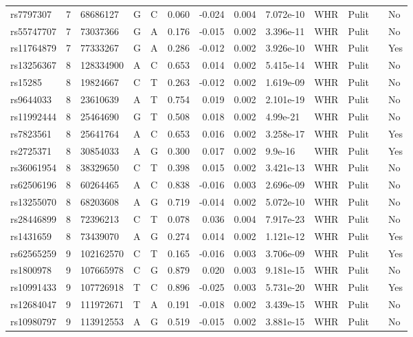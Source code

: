 \documentclass[11pt,twoside]{bristolthesis}
\begin{document}
\begin{longtable}[t]{lrlllrrrlllll}
rs7797307 & 7 & 68686127 & G & C & 0.060 & -0.024 & 0.004 & 7.072e-10 & WHR & Pulit &  & No\\
rs55747707 & 7 & 73037366 & G & A & 0.176 & -0.015 & 0.002 & 3.396e-11 & WHR & Pulit &  & No\\
rs11764879 & 7 & 77333267 & G & A & 0.286 & -0.012 & 0.002 & 3.926e-10 & WHR & Pulit &  & Yes\\
\addlinespace
rs13256367 & 8 & 128334900 & A & C & 0.653 & 0.014 & 0.002 & 5.415e-14 & WHR & Pulit &  & No\\
rs15285 & 8 & 19824667 & C & T & 0.263 & -0.012 & 0.002 & 1.619e-09 & WHR & Pulit &  & No\\
rs9644033 & 8 & 23610639 & A & T & 0.754 & 0.019 & 0.002 & 2.101e-19 & WHR & Pulit &  & No\\
rs11992444 & 8 & 25464690 & G & T & 0.508 & 0.018 & 0.002 & 4.99e-21 & WHR & Pulit &  & No\\
rs7823561 & 8 & 25641764 & A & C & 0.653 & 0.016 & 0.002 & 3.258e-17 & WHR & Pulit &  & Yes\\
\addlinespace
rs2725371 & 8 & 30854033 & A & G & 0.300 & 0.017 & 0.002 & 9.9e-16 & WHR & Pulit &  & Yes\\
rs36061954 & 8 & 38329650 & C & T & 0.398 & 0.015 & 0.002 & 3.421e-13 & WHR & Pulit &  & No\\
rs62506196 & 8 & 60264465 & A & C & 0.838 & -0.016 & 0.003 & 2.696e-09 & WHR & Pulit &  & No\\
rs13255070 & 8 & 68203608 & A & G & 0.719 & -0.014 & 0.002 & 5.072e-10 & WHR & Pulit &  & No\\
rs28446899 & 8 & 72396213 & C & T & 0.078 & 0.036 & 0.004 & 7.917e-23 & WHR & Pulit &  & No\\
\addlinespace
rs1431659 & 8 & 73439070 & A & G & 0.274 & 0.014 & 0.002 & 1.121e-12 & WHR & Pulit &  & Yes\\
rs62565259 & 9 & 102162570 & C & T & 0.165 & -0.016 & 0.003 & 3.706e-09 & WHR & Pulit &  & Yes\\
rs1800978 & 9 & 107665978 & C & G & 0.879 & 0.020 & 0.003 & 9.181e-15 & WHR & Pulit &  & No\\
rs10991433 & 9 & 107726918 & T & C & 0.896 & -0.025 & 0.003 & 5.731e-20 & WHR & Pulit &  & Yes\\
rs12684047 & 9 & 111972671 & T & A & 0.191 & -0.018 & 0.002 & 3.439e-15 & WHR & Pulit &  & No\\
\addlinespace
rs10980797 & 9 & 113912553 & A & G & 0.519 & -0.015 & 0.002 & 3.881e-15 & WHR & Pulit &  & No\\

\end{longtable}
\end{document}
